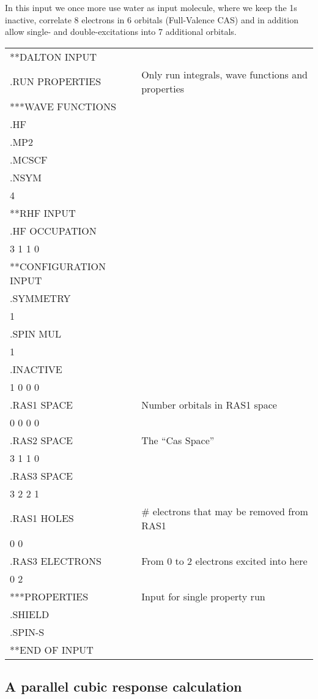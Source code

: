 In this input we once more use water as input molecule,
where we keep 
the 1s inactive, correlate 8 electrons in 6 orbitals (Full-Valence
CAS) and in addition allow single- and double-excitations into
7 additional orbitals.

{\ttfamily
\begin{tabular}{ll}
**DALTON INPUT\\
.RUN PROPERTIES\hspace{3cm} & Only run integrals, wave
functions and properties\\
***WAVE FUNCTIONS\\
.HF\\
.MP2\\
.MCSCF\\
.NSYM\\
 4\\
**RHF INPUT\\
.HF OCCUPATION\\
 3 1 1 0\\
**CONFIGURATION INPUT\\
.SYMMETRY\\
 1\\
.SPIN MUL\\
 1\\
.INACTIVE\\
 1 0 0 0\\
.RAS1 SPACE & Number orbitals in RAS1 space\\
 0 0 0 0\\
.RAS2 SPACE & The ``Cas Space''\\
 3 1 1 0\\
.RAS3 SPACE\\
 3 2 2 1\\
.RAS1 HOLES & \# electrons that may be removed from RAS1\\
 0 0\\
.RAS3 ELECTRONS & From 0 to 2 electrons excited into here\\
 0 2\\
***PROPERTIES & Input for single property run\\
.SHIELD\\
.SPIN-S\\
**END OF INPUT\\
\end{tabular}}

\subsection{A parallel cubic response calculation}

